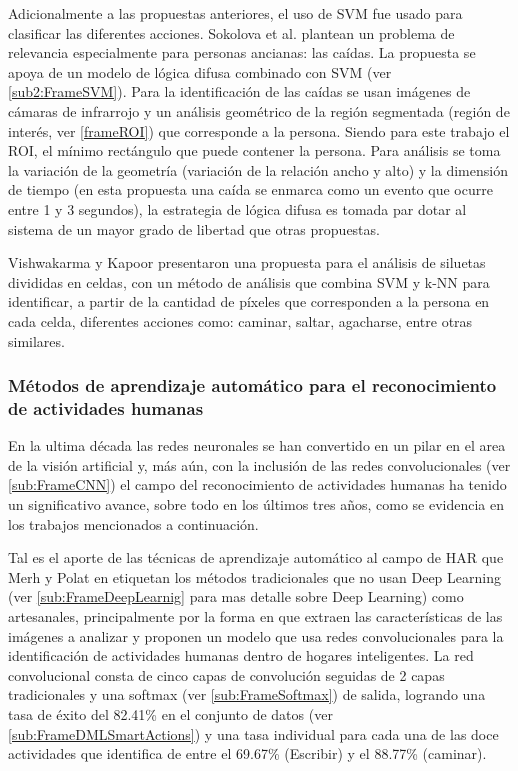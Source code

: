         Adicionalmente a las propuestas anteriores, el uso de SVM fue usado para clasificar las diferentes acciones. Sokolova et al. \cite{Sokolova2013} plantean un problema de relevancia especialmente para personas ancianas: las caídas. La propuesta \cite{Sokolova2013} se apoya de un modelo de lógica difusa combinado con SVM (ver \ref{sub2:FrameSVM}). Para la identificación de las caídas se usan imágenes de cámaras de infrarrojo y un análisis geométrico de la región segmentada (región de interés, ver \ref{frameROI}) que corresponde a la persona. Siendo para este trabajo el ROI, el mínimo rectángulo que puede contener la persona. Para análisis se toma la variación de la geometría (variación de la relación ancho y alto) y la dimensión de tiempo (en esta propuesta una caída se enmarca como un evento que ocurre entre 1 y 3 segundos), la estrategia de lógica difusa es tomada par dotar al sistema de un mayor grado de libertad que otras propuestas.
        
        Vishwakarma y Kapoor \cite{Vishwakarma2015} presentaron una propuesta para el análisis de siluetas divididas en celdas, con un método de análisis que combina SVM y k-NN para identificar, a partir de la cantidad de píxeles que corresponden a la persona en cada celda, diferentes acciones como: caminar, saltar, agacharse, entre otras similares.
        
        \subsubsection{Métodos de aprendizaje automático para el reconocimiento de actividades humanas}
        \label{Sub2:FrameHARNN}
        
        En la ultima década las redes neuronales se han convertido en un pilar en el area de la visión artificial y, más aún, con la inclusión de las redes convolucionales (ver \ref{sub:FrameCNN}) el campo del reconocimiento de actividades humanas ha tenido un significativo avance, sobre todo en los últimos tres años, como se evidencia en los trabajos mencionados a continuación.
        
        Tal es el aporte de las técnicas de aprendizaje automático al campo de HAR que Merh y Polat en \cite{mehr2019HarCnn} etiquetan los métodos tradicionales que no usan Deep Learning (ver \ref{sub:FrameDeepLearnig} para mas detalle sobre Deep Learning) como artesanales, principalmente por la forma en que extraen las características de las imágenes a analizar y proponen un modelo que usa redes convolucionales para la identificación de actividades humanas dentro de hogares inteligentes. La red convolucional consta de cinco capas de convolución seguidas de 2 capas tradicionales y una softmax (ver \ref{sub:FrameSoftmax}) de salida, logrando una tasa de éxito del 82.41\% en el conjunto de datos (ver \ref{sub:FrameDMLSmartActions}) y una tasa individual para cada una de las doce actividades que identifica de entre el 69.67\% (Escribir) y el 88.77\% (caminar).
        
